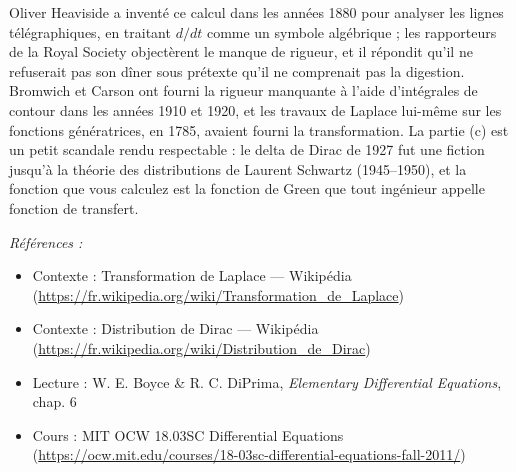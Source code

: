 \documentclass[11pt]{article}
\newenvironment{refs}{\par\small\noindent\emph{Références :}\begin{itemize}\setlength\itemsep{0pt}}{\end{itemize}\normalsize}
\begin{document}
\noindent Oliver Heaviside a inventé ce calcul dans les années 1880 pour analyser les
lignes télégraphiques, en traitant $ d/dt $ comme un symbole algébrique ; les rapporteurs de la
Royal Society objectèrent le manque de rigueur, et il répondit qu'il ne refuserait pas son dîner
sous prétexte qu'il ne comprenait pas la digestion. Bromwich et Carson ont fourni la rigueur
manquante à l'aide d'intégrales de contour dans les années 1910 et 1920, et les travaux de
Laplace lui-même sur les fonctions génératrices, en 1785, avaient fourni la transformation. La
partie (c) est un petit scandale rendu respectable : le delta de Dirac de 1927 fut une fiction
jusqu'à la théorie des distributions de Laurent Schwartz (1945--1950), et la fonction que vous
calculez est la fonction de Green que tout ingénieur appelle fonction de transfert.

\begin{refs}
\item Contexte : Transformation de Laplace --- Wikipédia (\url{https://fr.wikipedia.org/wiki/Transformation_de_Laplace})
\item Contexte : Distribution de Dirac --- Wikipédia (\url{https://fr.wikipedia.org/wiki/Distribution_de_Dirac})
\item Lecture : W. E. Boyce \& R. C. DiPrima, \textit{Elementary Differential Equations}, chap. 6
\item Cours : MIT OCW 18.03SC Differential Equations (\url{https://ocw.mit.edu/courses/18-03sc-differential-equations-fall-2011/})
\end{refs}

\bigskip
\end{document}
